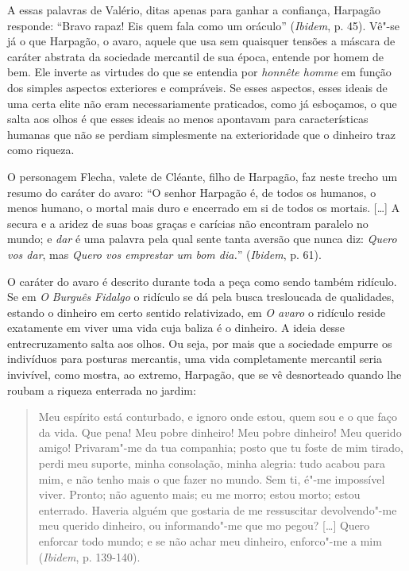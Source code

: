 A essas palavras de Valério, ditas apenas para ganhar a confiança,
Harpagão responde: ``Bravo rapaz! Eis quem fala como um oráculo''
(\emph{Ibidem}, p. 45). Vê"-se já o que Harpagão, o avaro, aquele que usa
sem quaisquer tensões a máscara de caráter abstrata da sociedade
mercantil de sua época, entende por homem de bem. Ele inverte as
virtudes do que se entendia por \emph{honnête homme} em função dos
simples aspectos exteriores e compráveis. Se esses aspectos, esses
ideais de uma certa elite não eram necessariamente praticados, como já
esboçamos, o que salta aos olhos é que esses ideais ao menos apontavam
para características humanas que não se perdiam simplesmente na
exterioridade que o dinheiro traz como riqueza.

O personagem Flecha, valete de Cléante, filho de Harpagão, faz neste
trecho um resumo do caráter do avaro: ``O senhor Harpagão é, de todos os
humanos, o menos humano, o mortal mais duro e encerrado em si de todos
os mortais. [\ldots{}] A secura e a aridez de suas boas graças e
carícias não encontram paralelo no mundo; e \emph{dar} é uma palavra
pela qual sente tanta aversão que nunca diz: \emph{Quero vos dar}, mas
\emph{Quero vos emprestar um bom dia.}'' (\emph{Ibidem}, p. 61).

O caráter do avaro é descrito durante toda a peça como sendo também
ridículo. Se em \emph{O} \emph{Burguês} \emph{Fidalgo} o ridículo se dá
pela busca tresloucada de qualidades, estando o dinheiro em certo
sentido relativizado, em \emph{O avaro} o ridículo reside exatamente em
viver uma vida cuja baliza é o dinheiro. A ideia desse entrecruzamento
salta aos olhos. Ou seja, por mais que a sociedade empurre os indivíduos
para posturas mercantis, uma vida completamente mercantil seria
invivível, como mostra, ao extremo, Harpagão, que se vê desnorteado
quando lhe roubam a riqueza enterrada no jardim:

\begin{quote}
Meu espírito está conturbado, e ignoro onde estou, quem sou e o que faço
da vida. Que pena! Meu pobre dinheiro! Meu pobre dinheiro! Meu querido
amigo! Privaram"-me da tua companhia; posto que tu foste de mim tirado,
perdi meu suporte, minha consolação, minha alegria: tudo acabou para
mim, e não tenho mais o que fazer no mundo. Sem ti, é"-me impossível
viver. Pronto; não aguento mais; eu me morro; estou morto; estou
enterrado. Haveria alguém que gostaria de me ressuscitar devolvendo"-me
meu querido dinheiro, ou informando"-me que mo pegou? [\ldots{}]
Quero enforcar todo mundo; e se não achar meu dinheiro, enforco"-me a
mim (\emph{Ibidem}, p. 139-140).
\end{quote}


